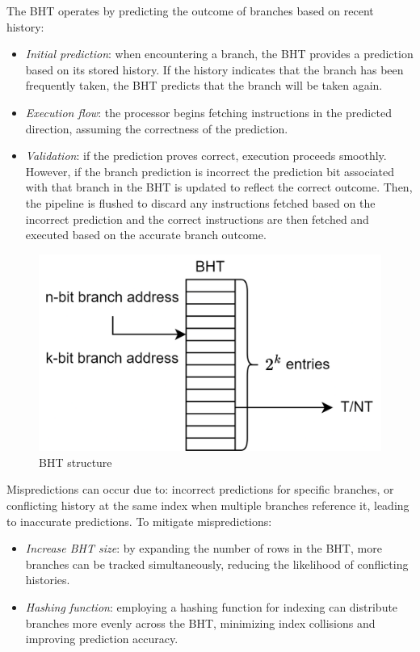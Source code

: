 The BHT operates by predicting the outcome of branches based on recent history:
\begin{itemize}
    \item \textit{Initial prediction}: when encountering a branch, the BHT provides a prediction based on its stored history. 
        If the history indicates that the branch has been frequently taken, the BHT predicts that the branch will be taken again.
    \item \textit{Execution flow}: the processor begins fetching instructions in the predicted direction, assuming the correctness of the prediction.
    \item \textit{Validation}: if the prediction proves correct, execution proceeds smoothly.
        However, if the branch prediction is incorrect the prediction bit associated with that branch in the BHT is updated to reflect the correct outcome.
        Then, the pipeline is flushed to discard any instructions fetched based on the incorrect prediction and the correct instructions are then fetched and executed based on the accurate branch outcome.
\end{itemize}
\begin{figure}[H]
    \centering
    \includegraphics[width=0.5\linewidth]{images/bht.png}
    \caption{BHT structure}
\end{figure}
Mispredictions can occur due to: incorrect predictions for specific branches, or conflicting history at the same index when multiple branches reference it, leading to inaccurate predictions.
To mitigate mispredictions:
\begin{itemize}
    \item \textit{Increase BHT size}: by expanding the number of rows in the BHT, more branches can be tracked simultaneously, reducing the likelihood of conflicting histories.
    \item \textit{Hashing function}: employing a hashing function for indexing can distribute branches more evenly across the BHT, minimizing index collisions and improving prediction accuracy.
\end{itemize}

